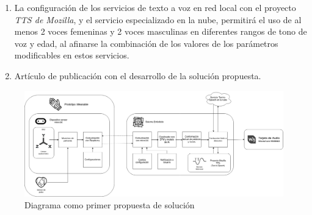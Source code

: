 \begin{enumerate}
	\item La configuración de los servicios de texto a voz en red local con el proyecto \textit{TTS de Mozilla}, y el servicio especializado en la nube, permitirá el uso de al menos 2 voces femeninas y 2 voces masculinas en diferentes rangos de tono de voz y edad, al afinarse la combinación de los valores de los parámetros modificables en estos servicios.
	
	\item Artículo de publicación con el desarrollo de la solución propuesta.
\end{enumerate}

\begin{figure}[!h]
	\centering
	\includegraphics[width=16cm]{Imagenes/Diagrama.png}
	\caption{Diagrama como primer propuesta de solución}
	\label{Diagrama}
\end{figure}